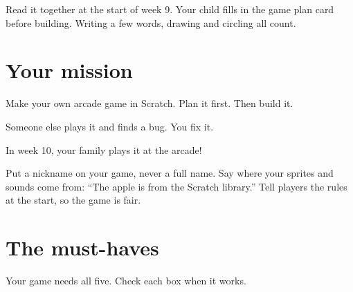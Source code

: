 \documentclass[track=junior,level=2]{kidscode}
\begin{document}

\begin{grownup}
Read it together at the start of week 9. Your child fills in the game plan card before building.
Writing a few words, drawing and circling all count.
\end{grownup}

\section{Your mission}
Make your own arcade game in Scratch. Plan it first. Then build it.\par
Someone else plays it and finds a bug. You fix it.\par
In week 10, your family plays it at the arcade!

\begin{safety}
Put a nickname on your game, never a full name.
Say where your sprites and sounds come from: \enquote{The apple is from the Scratch library.}
Tell players the rules at the start, so the game is fair.
\end{safety}

\section{The must-haves}
Your game needs all five. Check each box when it works.
\end{document}
